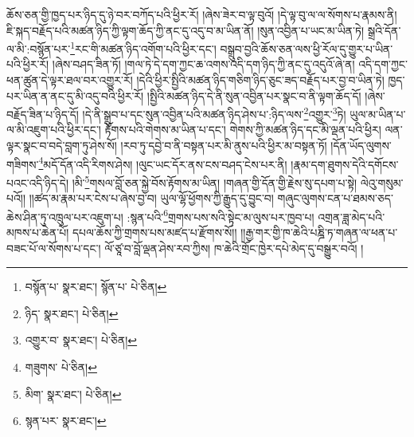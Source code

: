 ཆོས་ཅན་གྱི་ཁྱད་པར་ཉིད་དུ་ཉེ་བར་བཀོད་པའི་ཕྱིར་རོ། །ཞེས་ཟེར་བ་ལྟ་བུའོ། །དེ་ལྟ་བུ་ལ་ལ་སོགས་པ་རྣམས་ནི། ཇི་སྐད་བརྗོད་པའི་མཚན་ཉིད་ཀྱི་ལྟག་ཆོད་ཀྱི་ནང་དུ་འདུ་བ་མ་ཡིན་ནོ། །སུན་འབྱིན་པ་ཡང་མ་ཡིན་ཏེ། སྒྲའི་དོན་ལ་མི་:བསྙོན་པར་\footnote{བསྙོན་པ་  སྣར་ཐང་། སྙོན་པ་  པེ་ཅིན། }རང་གི་མཚན་ཉིད་འགོག་པའི་ཕྱིར་དང་། བསྒྲུབ་བྱའི་ཆོས་ཅན་ལས་ཕྱི་རོལ་དུ་གྱུར་པ་ཡིན་པའི་ཕྱིར་རོ། །ཞེས་བཤད་ཟིན་ཏོ། །གལ་ཏེ་དེ་དག་ཀྱང་ཆ་འགས་འདི་དག་ཉིད་ཀྱི་ནང་དུ་འདུའོ་ཞེ་ན། འདི་དག་ཀྱང་ཕན་ཚུན་དེ་ལྟར་ཐལ་བར་འགྱུར་རོ། །དེའི་ཕྱིར་སྤྱིའི་མཚན་ཉིད་གཅིག་ཉིད་ཅུང་ཟད་བརྗོད་པར་བྱ་བ་ཡིན་ཏེ། ཁྱད་པར་ཡིན་ན་ནང་དུ་མི་འདུ་བའི་ཕྱིར་རོ། །སྤྱིའི་མཚན་ཉིད་དེ་ནི་སུན་འབྱིན་པར་སྣང་བ་ནི་ལྟག་ཆོད་དོ། །ཞེས་བརྗོད་ཟིན་པ་ཉིད་དོ། །དེ་ནི་སྒྲུབ་པ་དང་སུན་འབྱིན་པའི་མཚན་ཉིད་ཤེས་པ་:ཉིད་ལས་\footnote{ཉིད་  སྣར་ཐང་།  པེ་ཅིན། }འགྱུར་\footnote{འགྱུར་བ་  སྣར་ཐང་།  པེ་ཅིན། }ཏེ། ཡུལ་མ་ཡིན་པ་ལ་མི་འཇུག་པའི་ཕྱིར་དང་། རྟོགས་པའི་གེགས་མ་ཡིན་པ་དང་། གེགས་ཀྱི་མཚན་ཉིད་དང་མི་ལྡན་པའི་ཕྱིར། ལན་ལྟར་སྣང་བ་བདེ་བླག་ཏུ་ཤེས་སོ། །རབ་ཏུ་དབྱེ་བ་ནི་བསྟན་པར་མི་ནུས་པའི་ཕྱིར་མ་བསྟན་ཏོ། །དོན་ཡོད་ལུགས་གཟིགས་\footnote{གཟུགས་  པེ་ཅིན། }མདོ་དོན་འདི་རིགས་ཤེས། །ལུང་ཡང་དོར་ནས་ངས་བཤད་ངེས་པར་ནི། །རྣམ་དག་ཐུགས་དེའི་དགོངས་པའང་འདི་ཉིད་དེ། །མི་\footnote{མིག་  སྣར་ཐང་།  པེ་ཅིན། }གསལ་བློ་ཅན་སྐྱེ་བོས་རྟོགས་མ་ཡིན། །གཞན་གྱི་དོན་གྱི་རྗེས་སུ་དཔག་པ་སྟེ། ལེའུ་གསུམ་པའོ།། །།ཚད་མ་རྣམ་པར་ངེས་པ་ཞེས་བྱ་བ། ཡུལ་ལྷོ་ཕྱོགས་ཀྱི་རྒྱུད་དུ་བྱུང་བ། གཞུང་ལུགས་ངན་པ་ཐམས་ཅད་ཆེས་ཤིན་ཏུ་འཁྲུལ་པར་འཇུག་པ། :སྙན་པའི་\footnote{སྙན་པར་  སྣར་ཐང་། }གྲགས་པས་སའི་སྟེང་མ་ལུས་པར་ཁྱབ་པ། འགྲན་ཟླ་མེད་པའི་མཁས་པ་ཆེན་པོ། དཔལ་ཆོས་ཀྱི་གྲགས་པས་མཛད་པ་རྫོགས་སོ།། །།རྒྱ་གར་གྱི་ཁ་ཆེའི་པཎྜི་ཏ་གཞན་ལ་ཕན་པ་བཟང་པོ་ལ་སོགས་པ་དང་། ལོ་ཙཱ་བ་བློ་ལྡན་ཤེས་རབ་ཀྱིས། ཁ་ཆེའི་གྲོང་ཁྱེར་དཔེ་མེད་དུ་བསྒྱུར་བའོ། །